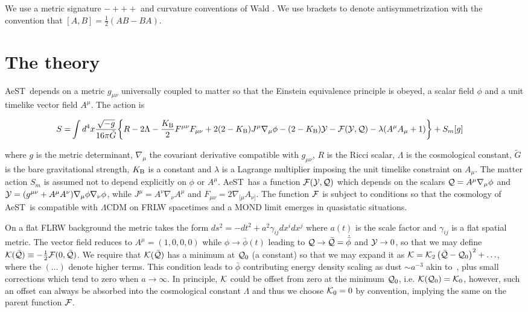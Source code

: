 \documentclass[twocolumn,prd,preprintnumbers,amsmath,amssymb,nofootinbib,superscriptaddress]{revtex4-1}
\newcommand{\phib}{{\bar{\phi}}}
\newcommand{\AeST}{AeST~}
\newcommand{\Kcal}{{\cal K}}
\newcommand{\Fcal}{{\cal F}}
\newcommand{\Qcalb}{\bar{{\cal Q}}}
\newcommand{\Qcal}{{\cal Q}}
\newcommand{\Ycal}{{\cal Y}}
\newcommand{\Gt}{\ensuremath{\tilde{G}}}
\newcommand{\KB}{\ensuremath{K_{{\rm B}}}}
\begin{document}
We use a metric signature $-+++$ and curvature conventions of Wald \cite{Wald:1984rg}.
We use brackets to denote antisymmetrization with the convention that $[A,B] = \frac{1}{2}(A B - B A)$.  

\section{The theory}
\label{Sec_theory}
\AeST depends on a metric $g_{\mu\nu}$ universally coupled to matter so that the Einstein equivalence principle is obeyed, a scalar field $\phi$ and a unit timelike vector field $A^\mu$. The action is 
\begin{widetext}
\begin{align}
S =&  \int d^4x \frac{\sqrt{-g}}{16\pi \Gt}\bigg\{ R  - 2 \Lambda
 - \frac{\KB}{2}  F^{\mu\nu} F_{\mu\nu} 
+ 2  (2-\KB) J^{\mu} \nabla_\mu \phi - (2-\KB) \Ycal
- \Fcal(\Ycal,\Qcal)
 - \lambda(A^\mu A_\mu+1)\bigg\}  + S_m[g]
\label{NT_A_action}
\end{align}
\end{widetext}
%
where $g$ is the metric determinant, $\nabla_\mu$ the covariant derivative compatible with $g_{\mu\nu}$,   $R$  is the Ricci scalar, $\Lambda$ is the cosmological constant,
$\Gt$ is the bare gravitational strength, $\KB$ is a constant and $\lambda$ is a Lagrange multiplier imposing the unit timelike constraint on $A_{\mu}$. 
The matter action $S_m$ is  assumed not to depend explicitly on $\phi$ or $A^\mu$.
\AeST has a function $\Fcal(\Ycal,\Qcal)$ which depends on the scalars $\Qcal = A^\mu \nabla_\mu \phi$ and $\Ycal= (g^{\mu\nu} + A^{\mu} A^{\nu})\nabla_\mu \phi \nabla_\nu \phi$, while
$J^\mu = A^\nu \nabla_\nu A^\mu$ and $F_{\mu\nu} = 2\nabla_{[\mu} A_{\nu]}$. 
The function $\Fcal$ is subject to conditions so that the  cosmology of \AeST is compatible with $\Lambda$CDM on
FRLW spacetimes and a MOND limit emerges in quasistatic situations.

On a flat FLRW background the metric takes the form $ds^2 = -dt^2 + a^2 \gamma_{ij} dx^i dx^j$ where $a(t)$ is the scale factor and $\gamma_{ij}$ is a flat spatial metric.
The vector field reduces to $A^\mu = ( 1, 0, 0, 0)$ while $\phi \rightarrow \phib(t)$ leading to $\Qcal\rightarrow \Qcalb = \dot{\phib}$ and  $\Ycal \rightarrow 0$,
so that we may define $\Kcal(\Qcalb) \equiv -\frac{1}{2} \Fcal(0,\Qcalb)$.
We require that $\Kcal(\Qcalb)$ has a minimum at $\Qcal_0$ (a constant) so that we may expand it as $\Kcal = \Kcal_2\left(\Qcalb - \Qcal_0\right)^2 + \ldots$, where the $(\ldots)$ denote 
higher terms.
This condition leads to $\phib$ contributing energy density scaling as dust $\sim a^{-3}$ akin to~\cite{Scherrer2004,ArkaniHamedEtAl2003},  plus small corrections which tend 
to zero when $a\rightarrow \infty$. In principle, $\Kcal$ could be offset from zero at the minimum $\Qcal_0$, i.e. $\Kcal(\Qcal_0) = \Kcal_0$,
 however, such an offset can always be absorbed into the cosmological constant $\Lambda$ and thus we choose $\Kcal_0 = 0$ by convention, implying the same on the parent function $\Fcal$.
\end{document}
